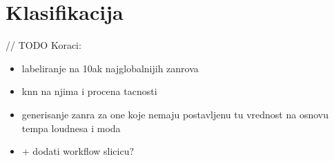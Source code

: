 \section{Klasifikacija}
\label{sec:Klasifikacija}


// TODO
 Koraci:
\begin{itemize}
  \item labeliranje na 10ak najglobalnijih zanrova
  \item  knn na njima i procena tacnosti
  \item generisanje zanra za one koje nemaju postavljenu tu vrednost na osnovu tempa loudnesa i moda
  \item + dodati workflow slicicu?
\end{itemize}






